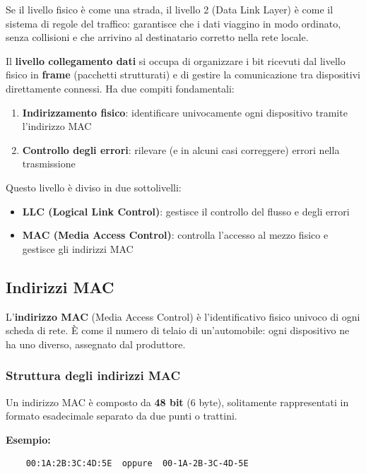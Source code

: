 \documentclass[12pt,a4paper]{article}
\begin{document}
Se il livello fisico è come una strada, il livello 2 (Data Link Layer) è come il sistema di regole del traffico: garantisce che i dati viaggino in modo ordinato, senza collisioni e che arrivino al destinatario corretto nella rete locale.

Il \textbf{livello collegamento dati} si occupa di organizzare i bit ricevuti dal livello fisico in \textbf{frame} (pacchetti strutturati) e di gestire la comunicazione tra dispositivi direttamente connessi. Ha due compiti fondamentali:
\begin{enumerate}
    \item \textbf{Indirizzamento fisico}: identificare univocamente ogni dispositivo tramite l'indirizzo MAC
    \item \textbf{Controllo degli errori}: rilevare (e in alcuni casi correggere) errori nella trasmissione
\end{enumerate}

Questo livello è diviso in due sottolivelli:
\begin{itemize}
    \item \textbf{LLC (Logical Link Control)}: gestisce il controllo del flusso e degli errori
    \item \textbf{MAC (Media Access Control)}: controlla l'accesso al mezzo fisico e gestisce gli indirizzi MAC
\end{itemize}

\subsection{Indirizzi MAC}

L'\textbf{indirizzo MAC} (Media Access Control) è l'identificativo fisico univoco di ogni scheda di rete. È come il numero di telaio di un'automobile: ogni dispositivo ne ha uno diverso, assegnato dal produttore.

\subsubsection{Struttura degli indirizzi MAC}

Un indirizzo MAC è composto da \textbf{48 bit} (6 byte), solitamente rappresentati in formato esadecimale separato da due punti o trattini.

\textbf{Esempio:} 
\begin{verbatim}
    00:1A:2B:3C:4D:5E  oppure  00-1A-2B-3C-4D-5E
\end{verbatim}
\end{document}
